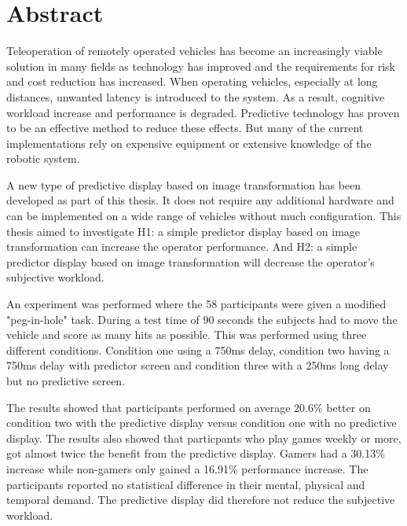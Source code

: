 \chapter*{Abstract}

Teleoperation of remotely operated vehicles has become an increasingly viable solution in many fields as technology has improved and the requirements for risk and cost reduction has increased. When operating vehicles, especially at long distances, unwanted latency is introduced to the system. As a result, cognitive workload increase and performance is degraded. Predictive technology has proven to be an effective method to reduce these effects. But many of the current implementations rely on expensive equipment or extensive knowledge of the robotic system.

A new type of predictive display based on image transformation has been developed as part of this thesis. It does not require any additional hardware and can be implemented on a wide range of vehicles without much configuration. This thesis aimed to investigate H1: a simple predictor display based on image transformation can increase the operator performance. And H2: a simple predictor display based on image transformation will decrease the operator's subjective workload.

An experiment was performed where the 58 participants were given a modified "peg-in-hole" task. During a test time of 90 seconds the subjects had to move the vehicle and score as many hits as possible. This was performed using three different conditions. Condition one using a 750ms delay, condition two having a 750ms delay with predictor screen and condition three with a 250ms long delay but no predictive screen.

The results showed that participants performed on average 20.6\% better on condition two with the predictive display versus condition one with no predictive display. The results also showed that particpants who play games weekly or more, got almost twice the benefit from the predictive display. Gamers had a 30.13\% increase while non-gamers only gained a 16.91\% performance increase. The participants reported no statistical difference in their mental, physical and temporal demand. The predictive display did therefore not reduce the subjective workload.
